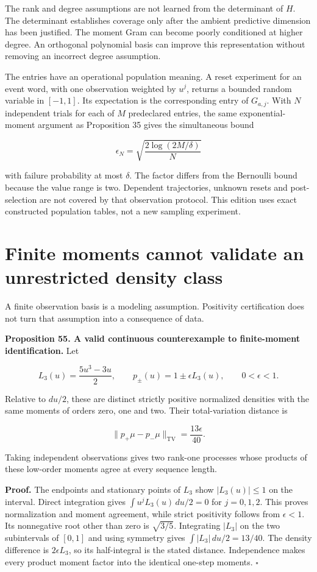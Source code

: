 The rank and degree assumptions are not learned from the determinant of
\(H\). The determinant establishes coverage only after the ambient
predictive dimension has been justified. The moment Gram can become
poorly conditioned at higher degree. An orthogonal polynomial basis can
improve this representation without removing an incorrect degree
assumption.

The entries have an operational population meaning. A reset experiment
for an event word, with one observation weighted by \(u^j\), returns a
bounded random variable in \([-1,1]\). Its expectation is the
corresponding entry of \(G_{a,j}\). With \(N\) independent trials for
each of \(M\) predeclared entries, the same exponential-moment argument
as Proposition 35 gives the simultaneous bound

\[
\epsilon_N=\sqrt{\frac{2\log(2M/\delta)}{N}}
\]

with failure probability at most \(\delta\). The factor differs from the
Bernoulli bound because the value range is two. Dependent trajectories,
unknown resets and post-selection are not covered by that observation
protocol. This edition uses exact constructed population tables, not a
new sampling experiment.

\section{Finite moments cannot validate an unrestricted density class}\label{LSM:finite-moments-cannot-validate-an-unrestricted-density-class}

A finite observation basis is a modeling assumption. Positivity
certification does not turn that assumption into a consequence of data.

\textbf{Proposition 55. A valid continuous counterexample to
finite-moment identification.} Let

\[
L_3(u)=\frac{5u^3-3u}{2},\qquad
p_\pm(u)=1\pm\epsilon L_3(u),\qquad 0<\epsilon<1.
\]

Relative to \(du/2\), these are distinct strictly positive normalized
densities with the same moments of orders zero, one and two. Their
total-variation distance is

\[
\boxed{\|p_+\mu-p_-\mu\|_{\mathrm{TV}}=\frac{13\epsilon}{40}.}
\]

Taking independent observations gives two rank-one processes whose
products of these low-order moments agree at every sequence length.

\textbf{Proof.} The endpoints and stationary points of \(L_3\) show
\(|L_3(u)|\leq1\) on the interval. Direct integration gives
\(\int u^jL_3(u)\,du/2=0\) for \(j=0,1,2\). This proves normalization
and moment agreement, while strict positivity follows from
\(\epsilon<1\). Its nonnegative root other than zero is \(\sqrt{3/5}\).
Integrating \(|L_3|\) on the two subintervals of \([0,1]\) and using
symmetry gives \(\int|L_3|\,du/2=13/40\). The density difference is
\(2\epsilon L_3\), so its half-integral is the stated distance.
Independence makes every product moment factor into the identical
one-step moments. \(\square\)

